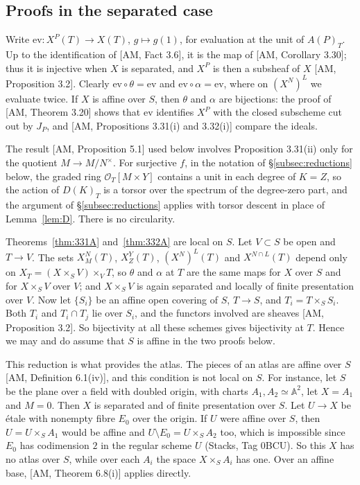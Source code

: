 \subsection{Proofs in the separated case}

Write $\mathrm{ev}\colon X^{P}(T)\to X(T)$, $g\mapsto g(1)$, for evaluation at the unit of $A(P)_T$. Up to the identification of [AM, Fact 3.6], it is the map of [AM, Corollary 3.30]; thus it is injective when $X$ is separated, and $X^P$ is then a subsheaf of $X$ [AM, Proposition 3.2]. Clearly $\mathrm{ev}\circ\theta=\mathrm{ev}$ and $\mathrm{ev}\circ\alpha=\mathrm{ev}$, where on $(X^N)^L$ we evaluate twice. If $X$ is affine over $S$, then $\theta$ and $\alpha$ are bijections: the proof of [AM, Theorem 3.20] shows that $\mathrm{ev}$ identifies $X^P$ with the closed subscheme cut out by $J_P$, and [AM, Propositions 3.31(i) and 3.32(i)] compare the ideals.

The result [AM, Proposition 5.1] used below involves Proposition 3.31(ii) only for the quotient $M\to M/N^{\times}$. For surjective $f$, in the notation of \S\ref{subsec:reductions} below, the graded ring $\mathcal{O}_T[M\times Y]$ contains a unit in each degree of $K=Z$, so the action of $D(K)_T$ is a torsor over the spectrum of the degree-zero part, and the argument of \S\ref{subsec:reductions} applies with torsor descent in place of Lemma~\ref{lem:D}. There is no circularity.

\begin{remark}\label{rem:Slocal}
Theorems~\ref{thm:331A} and~\ref{thm:332A} are local on $S$. Let $V\subset S$ be open and $T\to V$. The sets $X^{N}_{M}(T)$, $X^{Y}_{Z}(T)$, $(X^{N})^{L}(T)$ and $X^{N\cap L}(T)$ depend only on $X_T=(X\times_S V)\times_V T$, so $\theta$ and $\alpha$ at $T$ are the same maps for $X$ over $S$ and for $X\times_S V$ over $V$; and $X\times_S V$ is again separated and locally of finite presentation over $V$. Now let $\{S_i\}$ be an affine open covering of $S$, $T\to S$, and $T_i=T\times_S S_i$. Both $T_i$ and $T_i\cap T_j$ lie over $S_i$, and the functors involved are sheaves [AM, Proposition 3.2]. So bijectivity at all these schemes gives bijectivity at $T$. Hence we may and do assume that $S$ is affine in the two proofs below.

This reduction is what provides the atlas. The pieces of an atlas are affine over $S$ [AM, Definition 6.1(iv)], and this condition is not local on $S$. For instance, let $S$ be the plane over a field with doubled origin, with charts $A_1,A_2\simeq\mathbb{A}^2$, let $X=A_1$ and $M=0$. Then $X$ is separated and of finite presentation over $S$. Let $U\to X$ be étale with nonempty fibre $E_0$ over the origin. If $U$ were affine over $S$, then $U=U\times_S A_1$ would be affine and $U\setminus E_0=U\times_S A_2$ too, which is impossible since $E_0$ has codimension $2$ in the regular scheme $U$ (Stacks, Tag 0BCU). So this $X$ has no atlas over $S$, while over each $A_i$ the space $X\times_S A_i$ has one. Over an affine base, [AM, Theorem 6.8(i)] applies directly.
\end{remark}

